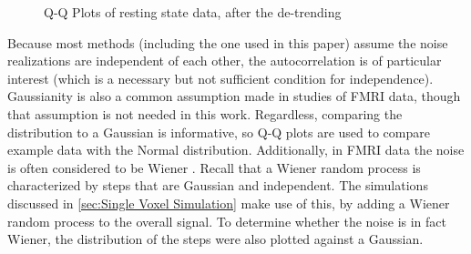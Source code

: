 \begin{figure}
\centering
{}
\caption{Q-Q Plots of resting state data, after the de-trending}
\label{fig:QQSpline}
\end{figure}

Because most methods (including the one used in this paper)
assume the noise realizations are independent of each other, the autocorrelation 
is of particular interest (which is a necessary but not
sufficient condition for independence). Gaussianity is also a common
assumption made in studies of FMRI data, though that assumption is not
needed in this work. Regardless, comparing the distribution to a Gaussian
is informative, so Q-Q plots are used to compare example data with the
Normal distribution. Additionally, in FMRI data the noise is often considered 
to be Wiener \cite{Riera2003}. Recall that a Wiener random process is
characterized by steps that are Gaussian and independent. The simulations discussed in 
\autoref{sec:Single Voxel Simulation} make use of this, 
by adding a Wiener random process to the overall signal. To determine
whether the noise is in fact Wiener, the distribution of 
the steps were also plotted against a Gaussian. 

